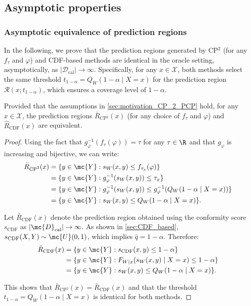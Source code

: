 \subsection{Asymptotic properties}
\label{sec:CP2_properties}

\subsubsection{Asymptotic equivalence of prediction regions}

In the following, we prove that the prediction regions generated by CP\(^2\) (for any \( f_\tau \) and \( \varphi \)) and CDF-based methods are identical in the oracle setting, asymptotically, as \( |\mathcal{D}_\text{cal}| \to \infty \). Specifically, for any \( x \in \mathcal{X} \), both methods select the same threshold \( t_{1 - \alpha} = Q_W(1 - \alpha \mid X = x) \) for the prediction region \( \mathcal{R}(x; t_{1 - \alpha}) \), which ensures a coverage level of \( 1 - \alpha \).

\begin{proposition}
Provided that the assumptions in \cref{sec:motivation_CP_2_PCP} hold, for any \( x \in \mathcal{X} \), the prediction regions \( \bar{R}_\text{CP$^2$}(x) \) (for any choice of \( f_\tau \) and \( \varphi \)) and \( \hat{R}_\text{CDF}(x) \) are equivalent.
\end{proposition}


\begin{proof}

Using the fact that \( g^{-1}_\varphi(f_\tau(\varphi)) = \tau \) for any \( \tau \in \R \) and that \( g_\varphi \) is increasing and bijective, we can write:
\begin{align}
  \bar{R}_\text{CP$^2$}(x)
  &= \{ y \in \mc{Y}: s_W(x, y) \leq f_{\tau_x}(\varphi) \} \\
  &= \{ y \in \mc{Y}: g^{-1}_\varphi(s_W(x, y)) \leq \tau_x \} \\
  &= \{ y \in \mc{Y}: g^{-1}_\varphi(s_W(x, y)) \leq g^{-1}_\varphi(Q_W(1 - \alpha \mid X = x)) \} \\
  &= \{ y \in \mc{Y}: s_W(x, y) \leq Q_W(1 - \alpha \mid X = x) \}.
\end{align}

Let \( \bar{R}_\text{CDF}(x) \) denote the prediction region obtained using the conformity score \( s_\text{CDF} \) as \( |\mc{D}_\text{cal}| \to \infty \). As shown in \cref{sec:CDF_based}, \( s_\text{CDF}(X, Y) \sim \mc{U}(0, 1) \), which implies \( \hat{q} = 1 - \alpha \). Therefore:
\begin{align}
  \bar{R}_\text{CDF}(x)
  &= \{ y \in \mc{Y}: s_\text{CDF}(x, y) \leq 1 - \alpha \} \\
  &= \{ y \in \mc{Y}: F_{W|x}(s_W(x, y) \mid X = x) \leq 1 - \alpha \} \\
  &= \{ y \in \mc{Y}: s_W(x, y) \leq Q_W(1 - \alpha \mid X = x) \}.
\end{align}

This shows that \( \bar{R}_\text{CP$^2$}(x) = \bar{R}_\text{CDF}(x) \) and that the threshold \( t_{1 - \alpha} = Q_W(1 - \alpha \mid X = x) \) is identical for both methods.

\end{proof}
